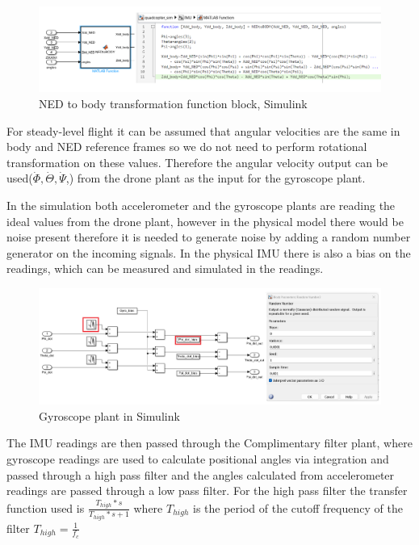 \begin{figure}[H]
    \begin{center}
    \includegraphics[scale = 0.5]{pictures/IMU/NED_to_bidy_function_block.png}
    \end{center}
    \caption{NED to body transformation function block, Simulink}
    \label{fig:my_label}
\end{figure}

For steady-level flight it can be assumed that angular velocities are the same in body and NED reference frames  so we do not need to perform rotational transformation on these values. Therefore the angular velocity output can  be used($\dot{\Phi}, \dot{\Theta}, \dot{\Psi}$,) from the drone plant as the input for the gyroscope plant. 

In the simulation both accelerometer and the gyroscope plants are reading the ideal values from the drone plant, however in the physical model there would be noise present therefore it is needed to generate noise by adding a random number generator on the incoming signals. In the physical IMU there is also a bias on the readings, which can be measured and simulated in the readings.

\begin{figure}[H]
    \begin{center}
    \includegraphics[scale = 0.45]{pictures/IMU/gyro_plant_nr_genrator.png}
    \end{center}
    \caption{Gyroscope plant in Simulink}
    \label{fig:my_label}
\end{figure}

The IMU readings are then passed through the Complimentary filter plant, where gyroscope readings are used to calculate positional angles via integration and passed through a high pass filter and the angles calculated from accelerometer readings are passed through a low pass filter. For the high pass filter the transfer function used is $\frac{T_{high}*s}{T_{high}*s+1}$ where $T_{high}$ is the period of the cutoff frequency of the filter $T_{high}=\frac{1}{f_c}$

